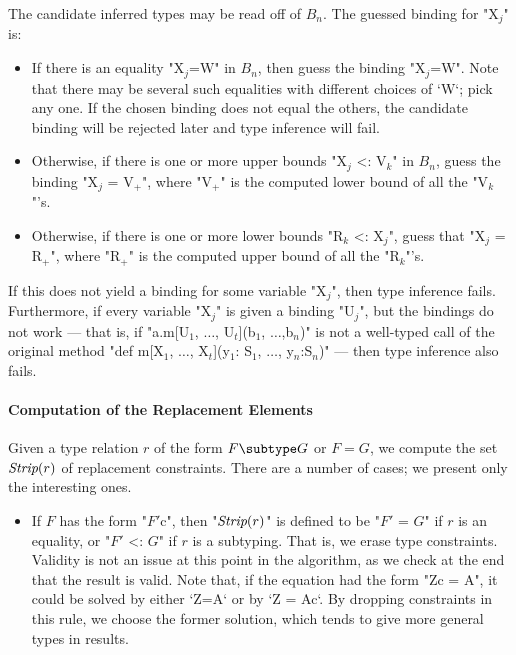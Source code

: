 {The candidate inferred types may be read off of {$B_n$}.  The guessed binding
for \xcdmath"X$_j$" is: 
\begin{itemize}
\item If there is an equality \xcdmath"X$_j$=W" in {$B_n$}, then guess the
      binding \xcdmath"X$_j$=W".  Note that there may be several such
      equalities with different choices of \xcd`W`; pick any one.  If the
      chosen binding does not equal the others, the candidate binding will be
      rejected later and type inference will fail. 
\item Otherwise, if there is one or more upper bounds 
\xcdmath"X$_j$ <: V$_k$" in {$B_n$}, guess the binding 
\xcdmath"X$_j$ = V$_+$", where 
\xcdmath"V$_+$" is the computed lower bound of all the \xcdmath"V$_k$"'s.
\item Otherwise, if there is one or more lower bounds 
\xcdmath"R$_k$ <: X$_j$", guess that
\xcdmath"X$_j$ = R$_+$", where 
\xcdmath"R$_+$" is the computed upper bound of all the \xcdmath"R$_k$"'s.
\end{itemize}
If this does not yield a binding for some variable \xcdmath"X$_j$", then type
inference fails.  Furthermore, if every variable \xcdmath"X$_j$" is given a
binding \xcdmath"U$_j$", but the 
bindings do not work --- 
that is, if 
\xcdmath"a.m[U$_1$, $\ldots$, U$_t$](b$_1$, $\ldots$,b$_n$)"
is not a well-typed call of 
the original method 
\xcdmath"def m[X$_1$, $\ldots$, X$_t$](y$_1$: S$_1$, $\ldots$, y$_n$:S$_n$)"
--- then type inference also fails.

\paragraph{Computation of the Replacement Elements}

Given a type relation
{$r$} of the form {$F \subtype G$}
or {$F = G$}, we compute the set {$\mbox{\it Strip}(r)$} of
replacement constraints.  There are a number of cases; we present only the
interesting ones. 

\begin{itemize}
\item If $F$ has the form \xcdmath"$F'${c}", then  
\xcdmath"$\mbox{\it Strip}(r)$" is defined to be
 \xcdmath"$F'$ = $G$" if $r$ is an equality, or 
 \xcdmath"$F'$ <: $G$" if {$r$} is a subtyping.
That is, we erase type constraints.  
Validity is not an issue at this point in the algorithm, as 
we check at the end that the result is valid.
Note that, if the equation had the form \xcdmath"Z{c} = A", it could be
solved by either \xcd`Z=A` or by \xcd`Z = A{c}`.  By dropping constraints in this
rule, we choose the former solution, which tends to give more general types in
results. 


\end{itemize}}
